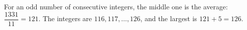 For an odd number of consecutive integers, the middle one is the average: $\dfrac{1331}{11}=121$. The integers are $116,117,\dots,126$, and the largest is $121+5=\boxed{126}$.
